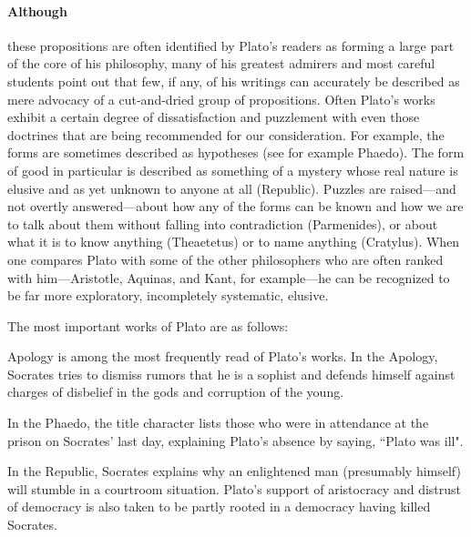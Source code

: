 \documentclass[11pt]{article}
\begin{document}
			\paragraph{Although} these propositions are often identified by Plato's readers as forming a large part of the core of his philosophy, many of his greatest admirers and most careful students point out that few, if any, of his writings can accurately be described as mere advocacy of a cut-and-dried group of propositions. Often Plato's works exhibit a certain degree of dissatisfaction and puzzlement with even those doctrines that are being recommended for our consideration. For example, the forms are sometimes described as hypotheses (see for example Phaedo). The form of good in particular is described as something of a mystery whose real nature is elusive and as yet unknown to anyone at all (Republic). Puzzles are raised---and not overtly answered---about how any of the forms can be known and how we are to talk about them without falling into contradiction (Parmenides), or about what it is to know anything (Theaetetus) or to name anything (Cratylus). When one compares Plato with some of the other philosophers who are often ranked with him---Aristotle, Aquinas, and Kant, for example---he can be recognized to be far more exploratory, incompletely systematic, elusive. 
			\par The most important works of Plato are as follows:
			\begin{description}[align=right]
				\item[Apology] Apology is among the most frequently read of Plato's works. In the Apology, Socrates tries to dismiss rumors that he is a sophist and defends himself against charges of disbelief in the gods and corruption of the young.
				\item[Phaedo] In the Phaedo, the title character lists those who were in attendance at the prison on Socrates' last day, explaining Plato's absence by saying, ``Plato was ill".
				\item[Republic] In the Republic, Socrates explains why an enlightened man (presumably himself) will stumble in a courtroom situation. Plato's support of aristocracy and distrust of democracy is also taken to be partly rooted in a democracy having killed Socrates.
			\end{description}
\end{document}
